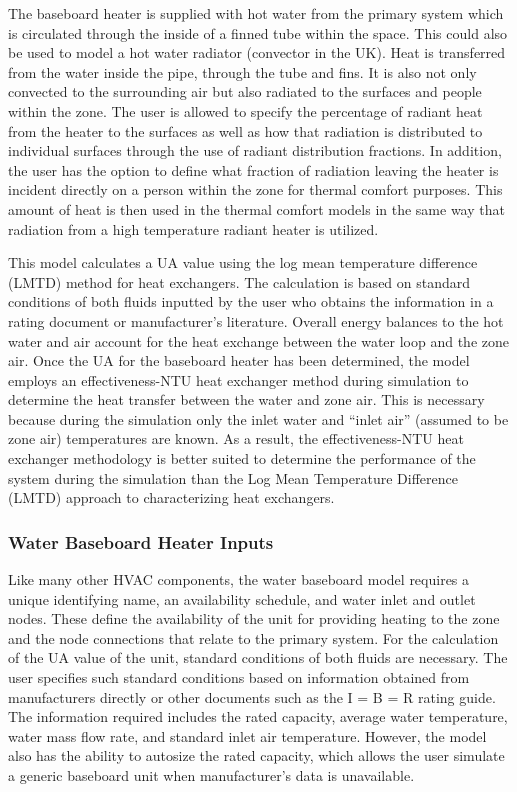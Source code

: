 The baseboard heater is supplied with hot water from the primary system which is circulated through the inside of a finned tube within the space. This could also be used to model a hot water radiator (convector in the UK). Heat is transferred from the water inside the pipe, through the tube and fins. It is also not only convected to the surrounding air but also radiated to the surfaces and people within the zone. The user is allowed to specify the percentage of radiant heat from the heater to the surfaces as well as how that radiation is distributed to individual surfaces through the use of radiant distribution fractions. In addition, the user has the option to define what fraction of radiation leaving the heater is incident directly on a person within the zone for thermal comfort purposes. This amount of heat is then used in the thermal comfort models in the same way that radiation from a high temperature radiant heater is utilized.

This model calculates a UA value using the log mean temperature difference (LMTD) method for heat exchangers. The calculation is based on standard conditions of both fluids inputted by the user who obtains the information in a rating document or manufacturer's literature. Overall energy balances to the hot water and air account for the heat exchange between the water loop and the zone air. Once the UA for the baseboard heater has been determined, the model employs an effectiveness-NTU heat exchanger method during simulation to determine the heat transfer between the water and zone air. This is necessary because during the simulation only the inlet water and ``inlet air'' (assumed to be zone air) temperatures are known. As a result, the effectiveness-NTU heat exchanger methodology is better suited to determine the performance of the system during the simulation than the Log Mean Temperature Difference (LMTD) approach to characterizing heat exchangers.

\subsubsection{Water Baseboard Heater Inputs}\label{water-baseboard-heater-inputs}

Like many other HVAC components, the water baseboard model requires a unique identifying name, an availability schedule, and water inlet and outlet nodes. These define the availability of the unit for providing heating to the zone and the node connections that relate to the primary system. For the calculation of the UA value of the unit, standard conditions of both fluids are necessary. The user specifies such standard conditions based on information obtained from manufacturers directly or other documents such as the I = B = R rating guide. The information required includes the rated capacity, average water temperature, water mass flow rate, and standard inlet air temperature. However, the model also has the ability to autosize the rated capacity, which allows the user simulate a generic baseboard unit when manufacturer's data is unavailable.


